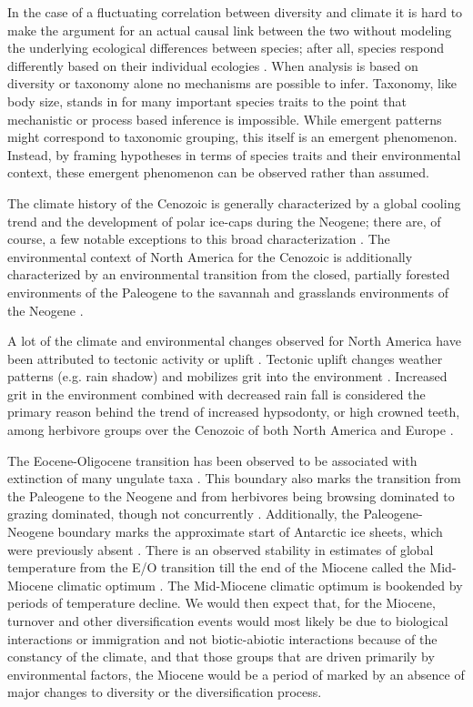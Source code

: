 \documentclass[12pt,letterpaper]{article}
\begin{document}
In the case of a fluctuating correlation between diversity and climate it is hard to make the argument for an actual causal link between the two without modeling the underlying ecological differences between species; after all, species respond differently based on their individual ecologies \citep{Blois2009}. When analysis is based on diversity or taxonomy alone no mechanisms are possible to infer. Taxonomy, like body size, stands in for many important species traits to the point that mechanistic or process based inference is impossible. While emergent patterns might correspond to taxonomic grouping, this itself is an emergent phenomenon. Instead, by framing hypotheses in terms of species traits and their environmental context, these emergent phenomenon can be observed rather than assumed.

The climate history of the Cenozoic is generally characterized by a global cooling trend and the development of polar ice-caps during the Neogene; there are, of course, a few notable exceptions to this broad characterization \citep{Zachos2001,Zachos2008,Cramer2011}. The environmental context of North America for the Cenozoic is additionally characterized by an environmental transition from the closed, partially forested environments of the Paleogene to the savannah and grasslands environments of the Neogene \citep{Blois2009,Janis1993b,Janis2000,Stromberg2005}.

A lot of the climate and environmental changes observed for North America have been attributed to tectonic activity or uplift \citep{Blois2009,Eronen2015,Janis2008a,Badgley2013}. Tectonic uplift changes weather patterns (e.g. rain shadow) and mobilizes grit into the environment \citep{Jardine2012}. Increased grit in the environment combined with decreased rain fall is considered the primary reason behind the trend of increased hypsodonty, or high crowned teeth, among herbivore groups over the Cenozoic of both North America and Europe \citep{Jernvall2002,Jardine2012,Damuth2011}.

The Eocene-Oligocene transition has been observed to be associated with extinction of many ungulate taxa \citep{Janis2008a}. This boundary also marks the transition from the Paleogene to the Neogene and from herbivores being browsing dominated to grazing dominated, though not concurrently \citep{Janis1993b,Stromberg2005}. Additionally, the Paleogene-Neogene boundary marks the approximate start of Antarctic ice sheets, which were previously absent \citep{Zachos2008}. There is an observed stability in estimates of global temperature from the E/O transition till the end of the Miocene called the Mid-Miocene climatic optimum \citep{Zachos2001,Zachos2008}. The Mid-Miocene climatic optimum is bookended by periods of temperature decline. We would then expect that, for the Miocene, turnover and other diversification events would most likely be due to biological interactions or immigration and not biotic-abiotic interactions because of the constancy of the climate, and that those groups that are driven primarily by environmental factors, the Miocene would be a period of marked by an absence of major changes to diversity or the diversification process.
\end{document}
